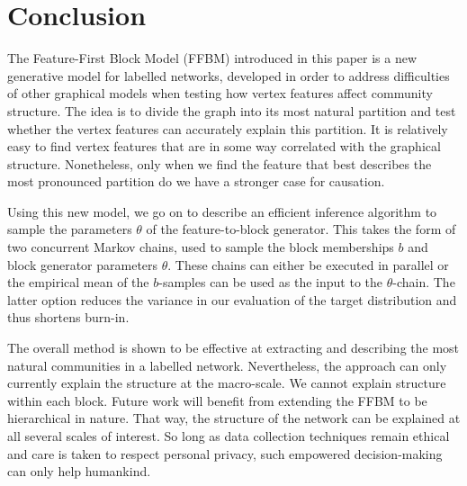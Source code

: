 \section{Conclusion}
\label{sec:conclusion}

The Feature-First Block Model (FFBM) introduced 
in this paper is a new generative model for labelled networks,
developed in order to address difficulties of other graphical models 
when testing how vertex features affect community structure. The idea 
is to divide the graph into its most natural partition and test whether 
the vertex features can accurately explain this partition. 
It is relatively easy to find vertex features that are in some way 
correlated with the graphical structure. Nonetheless, only when 
we find the feature that best describes the most pronounced partition 
do we have a stronger case for causation.

Using this new model,
we go on to describe an efficient inference algorithm to sample 
the parameters $\theta$ of the feature-to-block generator. 
This takes the form of two concurrent Markov chains,
used to sample the block memberships $b$ and block generator 
parameters $\theta$. These chains can either be executed
in parallel or 
the empirical mean of the $b$-samples can be used
as the input to the $\theta$-chain. The latter option
reduces the variance in our evaluation of the target distribution 
and thus shortens burn-in.

The overall method is shown to be effective at extracting and describing 
the most natural communities in a labelled network. Nevertheless, the approach 
can only currently explain the structure at the macro-scale. We cannot 
explain structure within each block. Future work will benefit from extending 
the FFBM to be hierarchical in nature. That way, the structure of the network 
can be explained at all several scales of interest. So long as data 
collection techniques remain ethical and care is taken to respect 
personal privacy, such empowered decision-making can only help humankind.


